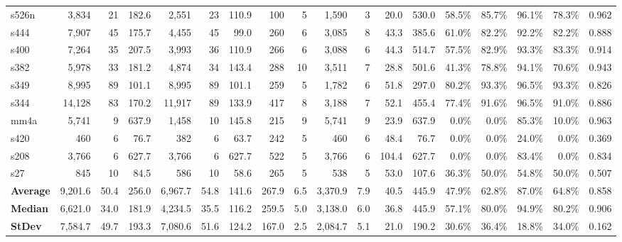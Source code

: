\documentclass{article}
\theoremstyle{definition}
\begin{document}
\begin{table}[ht]
{\begin{tabular}{lrrrrrrrrrrrrrrrrr}
s526n & 3,834 & 21 & 182.6 & 2,551 & 23 & 110.9 & 100 & 5 & 1,590 & 3 & 20.0 & 530.0 & 58.5\% & 85.7\% & 96.1\% & 78.3\% & 0.962 \\
s444 & 7,907 & 45 & 175.7 & 4,455 & 45 & 99.0 & 260 & 6 & 3,085 & 8 & 43.3 & 385.6 & 61.0\% & 82.2\% & 92.2\% & 82.2\% & 0.888 \\
s400 & 7,264 & 35 & 207.5 & 3,993 & 36 & 110.9 & 266 & 6 & 3,088 & 6 & 44.3 & 514.7 & 57.5\% & 82.9\% & 93.3\% & 83.3\% & 0.914 \\
s382 & 5,978 & 33 & 181.2 & 4,874 & 34 & 143.4 & 288 & 10 & 3,511 & 7 & 28.8 & 501.6 & 41.3\% & 78.8\% & 94.1\% & 70.6\% & 0.943 \\
s349 & 8,995 & 89 & 101.1 & 8,995 & 89 & 101.1 & 259 & 5 & 1,782 & 6 & 51.8 & 297.0 & 80.2\% & 93.3\% & 96.5\% & 93.3\% & 0.826 \\
s344 & 14,128 & 83 & 170.2 & 11,917 & 89 & 133.9 & 417 & 8 & 3,188 & 7 & 52.1 & 455.4 & 77.4\% & 91.6\% & 96.5\% & 91.0\% & 0.886 \\
mm4a & 5,741 & 9 & 637.9 & 1,458 & 10 & 145.8 & 215 & 9 & 5,741 & 9 & 23.9 & 637.9 & 0.0\% & 0.0\% & 85.3\% & 10.0\% & 0.963 \\
s420 & 460 & 6 & 76.7 & 382 & 6 & 63.7 & 242 & 5 & 460 & 6 & 48.4 & 76.7 & 0.0\% & 0.0\% & 24.0\% & 0.0\% & 0.369 \\
s208 & 3,766 & 6 & 627.7 & 3,766 & 6 & 627.7 & 522 & 5 & 3,766 & 6 & 104.4 & 627.7 & 0.0\% & 0.0\% & 83.4\% & 0.0\% & 0.834 \\
s27 & 845 & 10 & 84.5 & 586 & 10 & 58.6 & 265 & 5 & 538 & 5 & 53.0 & 107.6 & 36.3\% & 50.0\% & 54.8\% & 50.0\% & 0.507 \\
\midrule
\textbf{Average} & 9,201.6 & 50.4 & 256.0 & 6,967.7 & 54.8 & 141.6 & 267.9 & 6.5 & 3,370.9 & 7.9 & 40.5 & 445.9 & 47.9\% & 62.8\% & 87.0\% & 64.8\% & 0.858 \\
\textbf{Median} & 6,621.0 & 34.0 & 181.9 & 4,234.5 & 35.5 & 116.2 & 259.5 & 5.0 & 3,138.0 & 6.0 & 36.8 & 445.9 & 57.1\% & 80.0\% & 94.9\% & 80.2\% & 0.906 \\
\textbf{StDev} & 7,584.7 & 49.7 & 193.3 & 7,080.6 & 51.6 & 124.2 & 167.0 & 2.5 & 2,084.7 & 5.1 & 21.0 & 190.2 & 30.6\% & 36.4\% & 18.8\% & 34.0\% & 0.162 \\
\bottomrule
\end{tabular}%
}
\end{table}
\end{document}
